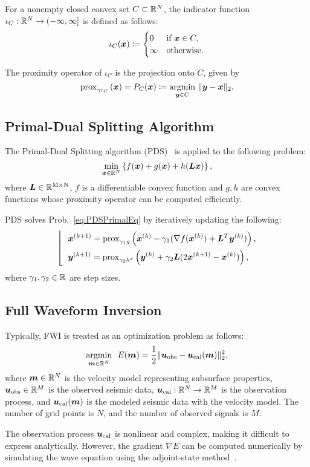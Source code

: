 For a nonempty closed convex set $C \subset \mathbb{R}^N$, the indicator function $\iota_C: \mathbb{R}^N \to (- \infty, \infty] $ is defined as follows:
\begin{equation} \label{eq:IndicatorFunctionDefinitionEq} \iota_{C}(\bm{x}) \coloneq \begin{cases} 0 & \text{if } \bm{x} \in C, \\ \infty & \text{otherwise}. \end{cases} \end{equation}

The proximity operator of $\iota_C$ is the projection onto $C$, given by
\begin{equation} \label{eq:ProximityOperatorDefinitionWithIndicatorFunctionEq}
\mathrm{prox}_{ \gamma \iota_{C} }\left(\bm{x}\right) = P_C(\bm{x}) \coloneq \underset{\bm{y} \in C}{\mathrm{argmin}} \ \lVert \bm{y} - \bm{x} \rVert _2.
\end{equation}



\subsection{Primal-Dual Splitting Algorithm} \label{subsec:primal-dual-splitting-algorithm}

The Primal-Dual Splitting algorithm (PDS)~\cite{PDS0,PDS1,PDS2,PDS3} is applied to the following problem:
\begin{equation} \label{eq:PDSPrimalEq} \underset{ \bm{x} \in \mathbb{R}^N }{\mathrm{min}} \left\{ f(\bm{x}) + g(\bm{x}) + h(\bm{L} \bm{x}) \right\}, \end{equation}
where $\bm{L} \in \mathbb{R}^{\mathrm{M} \times \mathrm{N}}$, $f$ is a differentiable convex function and $g,h$ are convex functions whose proximity operator can be computed efficiently.

PDS solves Prob.~\eqref{eq:PDSPrimalEq} by iteratively updating the following:
\begin{equation} \label{eq:PDSSubStep} \left \lfloor \ \ \begin{aligned} & \bm{x}^{(k+1)} = \mathrm{prox}_{\gamma_1 g}\left(\bm{x}^{(k)} - \gamma_1( \nabla f(\bm{x}^{(k)}) + \bm{L}^T \bm{y}^{(k)} )\right), \\ & \bm{y}^{(k+1)} = \mathrm{prox}_{\gamma_2 h^*}\left(\bm{y}^{(k)} + \gamma_2 \bm{L} (2\bm{x}^{(k+1)} - \bm{x}^{(k)}) \right), \\ \end{aligned} \right. \end{equation}
where $\gamma_1, \gamma_2 \in \mathbb{R}$ are step sizes.





\subsection{Full Waveform Inversion} \label{subsec:full-waveform-inversion}

Typically, FWI is treated as an optimization problem as follows\cite{FWI0}:
\begin{equation} \label{eq:FWIObjective} \underset{\bm{m} \in \mathbb{R}^N}{\mathrm{argmin}} \ \ E(\bm{m}) = \frac {1} {2} \lVert  \bm{u}_{\mathrm{obs}} - \bm{u}_{\mathrm{cal}}(\bm{m})  \rVert _2^2, \end{equation}
where $\bm{m} \in \mathbb{R}^{N}$ is the velocity model representing subsurface properties, $\bm{u}_{\mathrm{obs}} \in \mathbb{R}^{M}$ is the observed seismic data, $\bm{u}_{\mathrm{cal}} : \mathbb{R}^{N} \rightarrow \mathbb{R}^{M}$ is the observation process, and $\bm{u}_{\mathrm{cal}}(\bm{m})$ is the modeled seismic data with the velocity model.
The number of grid points is $N$, and the number of observed signals is $M$.

The observation process $\bm{u}_{\mathrm{cal}}$ is nonlinear and complex, making it difficult to express analytically.
However, the gradient $\nabla E$ can be computed numerically by simulating the wave equation using the adjoint-state method~\cite{FWI-gradient}.
